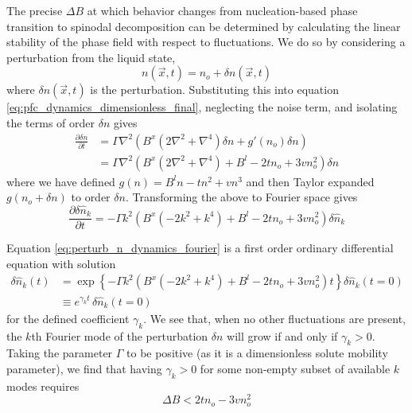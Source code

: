 The precise $\Delta B$ at which behavior changes from nucleation-based phase transition to spinodal decomposition can be determined by calculating the linear stability of the phase field with respect to fluctuations. We do so by considering a perturbation from the liquid state,
\begin{equation}\label{eq:perturb_n}
n(\vec{x},t) = n_o + \delta n(\vec{x},t)
\end{equation}
where $\delta n(\vec{x},t)$ is the perturbation. Substituting this into equation \ref{eq:pfc_dynamics_dimensionless_final}, neglecting the noise term, and isolating the terms of order $\delta n$ gives
\begin{equation}
\begin{split}
\frac{\partial \delta n}{\partial t} &= \Gamma \nabla^2 \left(B^x (2\nabla^2+\nabla^4)\delta n +g'(n_o)\delta n \right)\\ &= \Gamma \nabla^2 \left(B^x (2\nabla^2+\nabla^4) + B^l-2tn_o+3vn_o^2 \right)\delta n
\end{split}
\end{equation}
where we have defined $g(n)=B^l n -tn^2 +vn^3$ and then Taylor expanded $g(n_o+\delta n)$ to order $\delta n$. Transforming the above to Fourier space gives
\begin{equation}\label{eq:perturb_n_dynamics_fourier}
\frac{\partial \delta \hat{n}_k}{\partial t} =  -\Gamma k^2 \left(B^x (-2k^2+k^4) + B^l-2tn_o+3vn_o^2 \right)\delta \hat{n}_k
\end{equation}

Equation \ref{eq:perturb_n_dynamics_fourier} is a first order ordinary differential equation with solution
\begin{equation}\label{eq:perturn_ode_sol}
\begin{split}
\delta\hat{n}_k(t) &= \exp\left\{-\Gamma k^2 \left(B^x (-2k^2+k^4) + B^l-2tn_o+3vn_o^2 \right)t\right\} \delta\hat{n}_k(t=0)\\&\equiv e^{\gamma_k t}\, \delta\hat{n}_k(t=0)
\end{split}
\end{equation}
for the defined coefficient $\gamma_k$. We see that, when no other fluctuations are present, the $k$th Fourier mode of the perturbation $\delta n$ will grow if and only if $\gamma_k > 0$. Taking the parameter $\Gamma$ to be positive (as it is a dimensionless solute mobility parameter), we find that having $\gamma_k > 0$ for some non-empty subset of available $k$ modes requires
\begin{equation}\label{eq:pfc_spinodal_requirement}
\Delta B < 2tn_o -3vn_o^2
\end{equation}

